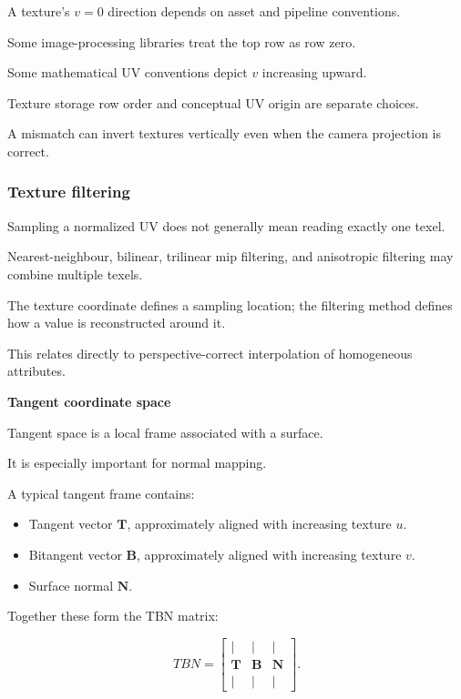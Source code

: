 A texture's \(v=0\) direction depends on asset and pipeline conventions.

Some image-processing libraries treat the top row as row zero.

Some mathematical UV conventions depict \(v\) increasing upward.

Texture storage row order and conceptual UV origin are separate choices.

A mismatch can invert textures vertically even when the camera projection is correct.

\subsubsection{Texture filtering}\label{02-foundations-ii-ch032-texture-filtering}

Sampling a normalized UV does not generally mean reading exactly one texel.

Nearest-neighbour, bilinear, trilinear mip filtering, and anisotropic filtering may combine multiple texels.

The texture coordinate defines a sampling location; the filtering method defines how a value is reconstructed around it.

This relates directly to perspective-correct interpolation of homogeneous attributes.

\textbf{Tangent coordinate space}

Tangent space is a local frame associated with a surface.

It is especially important for normal mapping.

A typical tangent frame contains:

\begin{itemize}
\tightlist
\item
  Tangent vector \(\mathbf T\), approximately aligned with increasing texture \(u\).
\item
  Bitangent vector \(\mathbf B\), approximately aligned with increasing texture \(v\).
\item
  Surface normal \(\mathbf N\).
\end{itemize}

Together these form the TBN matrix:

\[
 \boxed{ TBN= \begin{bmatrix} |&|&|\\ \mathbf T&\mathbf B&\mathbf N\\ |&|&| \end{bmatrix} }.
\]

